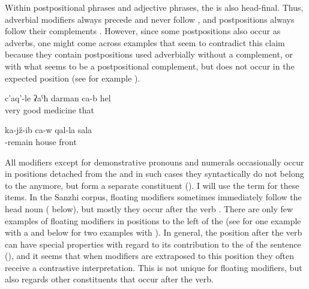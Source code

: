 Within postpositional phrases and adjective phrases, the  is also head-final. Thus, adverbial modifiers always precede and never follow  , and postpositions always follow their complements . However, since some postpositions also occur as adverbs, one might come across examples that seem to contradict this claim because they contain postpositions used adverbially without a complement, or with what seems to be a postpositional complement, but does not occur in the expected position (see  for example ).
%
\begin{exe}
	\ex	\label{ex:That is a very good medicine}
	\gll	c'aq'-le	ʡaˁħ	darman	ca-b	hel\\
		very	good	medicine		that\\
	\glt	{}

	\ex	\label{ex:He is sitting in front of the house}
	\gll	ka-jž-ib	ca-w	qal-la	sala\\
		-remain		house	front\\
	\glt	{}
\end{exe}

All modifiers except for demonstrative pronouns and numerals occasionally occur in positions detached from the  and in such cases they syntactically do not belong to the  anymore, but form a separate constituent (). I will use the term  for these items. In the Sanzhi corpus, floating modifiers sometimes immediately follow the head noun ( below), but mostly they occur after the verb . There are only few examples of floating modifiers in positions to the left of the  (see  for one example with a  and  below for two examples with ). In general, the position after the verb can have special properties with regard to its contribution to the  of the sentence (), and it seems that when modifiers are extraposed to this position they often receive a contrastive interpretation. This is not unique for floating modifiers, but also regards other constituents that occur after the verb. 

